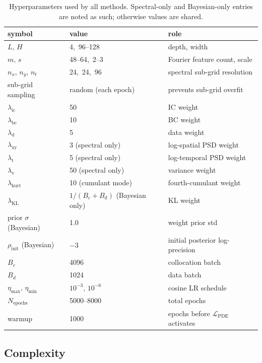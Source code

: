 \documentclass[review,12pt]{elsarticle}
\begin{document}
\begin{table}[h]
\centering
\caption{Hyperparameters used by all methods. Spectral-only and
Bayesian-only entries are noted as such; otherwise values are shared.}
\label{tab:hyper}
\begin{tabular}{l l l}
\toprule
symbol & value & role \\
\midrule
\(L,\,H\)          & 4,\, 96--128 & depth, width \\
\(m,\,s\)          & 48--64,\, 2--3 & Fourier feature count, scale \\
\(n_x,\,n_y,\,n_t\)     & 24,\, 24,\, 96 & spectral sub-grid resolution \\
sub-grid sampling       & random (each epoch) & prevents sub-grid overfit \\
\(\lambda_{\mathrm{ic}}\)  & 50 & IC weight \\
\(\lambda_{\mathrm{bc}}\)  & 10 & BC weight \\
\(\lambda_{\mathrm d}\)   & 5 & data weight \\
\(\lambda_{\mathrm{xy}}\)  & 3 (spectral only) & log-spatial PSD weight \\
\(\lambda_{\mathrm{t}}\)   & 5 (spectral only) & log-temporal PSD weight \\
\(\lambda_{\mathrm{v}}\)   & 50 (spectral only) & variance weight \\
\(\lambda_{\mathrm{kurt}}\) & 10 (cumulant mode) & fourth-cumulant weight \\
\(\lambda_{\mathrm{KL}}\)  & \(1/(B_c+B_d)\) (Bayesian only) & KL weight \\
prior \(\sigma\) (Bayesian) & 1.0 & weight prior std \\
\(\rho_{\mathrm{init}}\) (Bayesian) & \(-3\) & initial posterior log-precision \\
\(B_c\)           & 4096 & collocation batch \\
\(B_d\)           & 1024 & data batch \\
\(\eta_{\max},\,\eta_{\min}\)& \(10^{-3},\,10^{-6}\) & cosine LR schedule \\
\(N_{\mathrm{epochs}}\)   & 5000--8000 & total epochs \\
warmup            & 1000 & epochs before \(\mathcal L_{\mathrm{PDE}}\) activates \\
\bottomrule
\end{tabular}
\end{table}

\subsection{Complexity}
\end{document}
